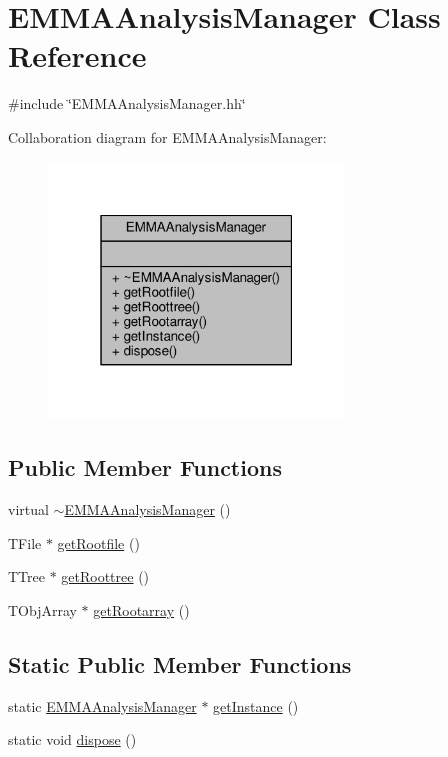 \hypertarget{classEMMAAnalysisManager}{}\section{E\+M\+M\+A\+Analysis\+Manager Class Reference}
\label{classEMMAAnalysisManager}


{\ttfamily \#include \char`\"{}E\+M\+M\+A\+Analysis\+Manager.\+hh\char`\"{}}



Collaboration diagram for E\+M\+M\+A\+Analysis\+Manager\+:
\nopagebreak
\begin{figure}[H]
\begin{center}
\leavevmode
\includegraphics[width=223pt]{classEMMAAnalysisManager__coll__graph}
\end{center}
\end{figure}
\subsection*{Public Member Functions}
\begin{DoxyCompactItemize}
\item 
virtual \hyperlink{classEMMAAnalysisManager_ab60583537cc376ec3d0142e7a90f3897}{$\sim$\+E\+M\+M\+A\+Analysis\+Manager} ()
\item 
T\+File $\ast$ \hyperlink{classEMMAAnalysisManager_a126149ed6ad7e03adf3e5dc87c143d33}{get\+Rootfile} ()
\item 
T\+Tree $\ast$ \hyperlink{classEMMAAnalysisManager_adfb53bfacb731ca9e8c5aebaa2a75c8d}{get\+Roottree} ()
\item 
T\+Obj\+Array $\ast$ \hyperlink{classEMMAAnalysisManager_aead08f08e4976274aeba24c1b6454831}{get\+Rootarray} ()
\end{DoxyCompactItemize}
\subsection*{Static Public Member Functions}
\begin{DoxyCompactItemize}
\item 
static \hyperlink{classEMMAAnalysisManager}{E\+M\+M\+A\+Analysis\+Manager} $\ast$ \hyperlink{classEMMAAnalysisManager_ae5ebfec95e60e4f592a3aad44d20058f}{get\+Instance} ()
\item 
static void \hyperlink{classEMMAAnalysisManager_a23b5430979212f4a845437b7482faa84}{dispose} ()
\end{DoxyCompactItemize}


